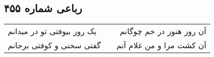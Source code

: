 \begin{center}
\section*{رباعی شماره ۴۵۵}
\label{sec:sh455}
\begin{longtable}{l p{0.5cm} r}
یک روز بیوفتی تو در میدانم
&&
آن روز هنوز در خم چوگانم
\\
گفتی سخنی و کوفتی برجانم
&&
آن کشت مرا و من غلام آنم
\\
\end{longtable}
\end{center}
